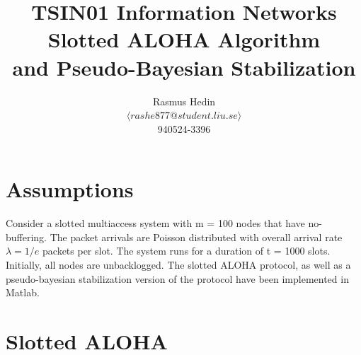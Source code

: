 \documentclass{article}
\begin{document}
\title{%
  TSIN01 Information Networks \\
  \large Slotted ALOHA Algorithm \\
  and Pseudo-Bayesian Stabilization}
\author{Rasmus Hedin \\
  $\langle rashe877@student.liu.se \rangle$ \\
940524-3396}

\maketitle

\section{Assumptions}
Consider a slotted multiaccess system with m = 100 nodes that have no-buffering. The packet arrivals are Poisson distributed with overall arrival rate $\lambda = 1/e$ packets per slot. The system runs for a duration of t = 1000 slots. Initially, all nodes are unbacklogged. The slotted ALOHA protocol, as well as a pseudo-bayesian stabilization version of the protocol have been implemented in Matlab.

\section{Slotted ALOHA}
\end{document}
